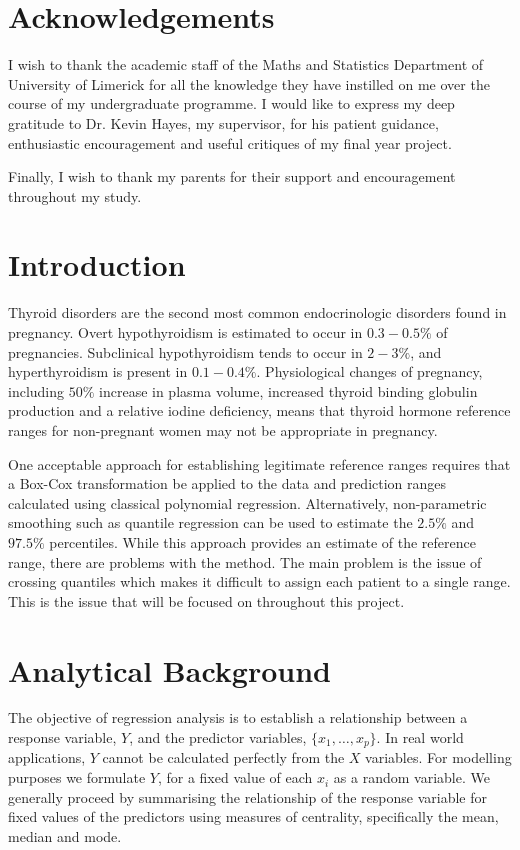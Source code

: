 \documentclass[12pt,a4paper]{report}
\begin{document}
\chapter*{Acknowledgements}
I wish to thank the academic staff of the Maths and Statistics Department of University of Limerick for all the knowledge they have instilled on me over the course of my undergraduate programme. I would like to express my deep gratitude to Dr. Kevin Hayes, my supervisor, for his patient guidance, enthusiastic encouragement and useful critiques of my final year project.
\vspace{2mm}
\par\noindent
Finally, I wish to thank my parents for their support and encouragement throughout my study.

\tableofcontents

\clearpage
{}
\chapter{Introduction}
Thyroid disorders are the second most common endocrinologic disorders found in pregnancy. Overt hypothyroidism is estimated to occur in $0.3-0.5\%$ of pregnancies. Subclinical hypothyroidism tends to occur in $2-3\%$, and hyperthyroidism is present in $0.1-0.4\%$.\citep{Thyroid-Facts} Physiological changes of pregnancy, including $50\%$ increase in plasma volume, increased thyroid binding globulin production and a relative iodine deficiency, means that thyroid hormone reference ranges for non-pregnant women may not be appropriate in pregnancy.
\vspace{2mm}

One acceptable approach for establishing legitimate reference ranges requires that a Box-Cox transformation be applied to the data and prediction ranges calculated using classical polynomial regression. Alternatively, non-parametric smoothing such as quantile regression can be used to estimate the $2.5\%$ and $97.5\%$ percentiles. While this approach provides an estimate of the reference range, there are problems with the method. The main problem is the issue of crossing quantiles which makes it difficult to assign each patient to a single range. This is the issue that will be focused on throughout this project.

\chapter{Analytical Background}
The objective of regression analysis is to establish a relationship between a response variable, $Y$, and the predictor variables, $\{x_{1},\ldots,x_{p}\}$. In real world applications, $Y$ cannot be calculated perfectly from the $X$ variables. For modelling purposes we formulate $Y$, for a fixed value of each $x_{i}$ as a random variable. We generally proceed by summarising the relationship of the response variable for fixed values of the predictors using measures of centrality, specifically the mean, median and mode.
\vspace{2mm}
\end{document}
